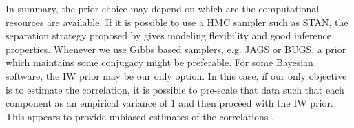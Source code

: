 \documentclass[12pt]{article}
\newcommand{\matt}[1]{\textcolor{red}{(matt: #1)}}
\begin{document}
In summary, the prior choice may depend on which are the computational resources are available. If it is possible to use a HMC sampler such as STAN, the separation strategy proposed by \cite{barnard2000} gives modeling flexibility and good inference properties. Whenever we use Gibbs based samplers, e.g. JAGS or BUGS, a prior which maintains some conjugacy might be preferable. For some Bayesian software, the IW prior may be our only option. In this case, if our only objective is to estimate the correlation, it is possible to pre-scale that data such that each component as an empirical variance of 1 and then proceed with the IW prior. This appears to provide unbiased estimates of the correlations \citep{CCalvarez}. 

      
      
\end{document}
